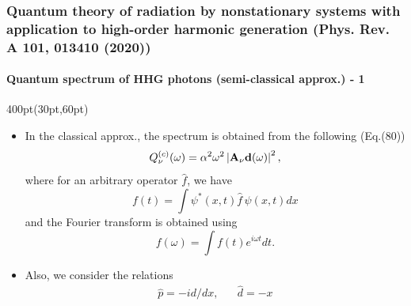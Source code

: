 \begin{frame}
\frametitle{Quantum theory of radiation by nonstationary systems 
	with application to high-order harmonic generation
        (Phys. Rev. A 101, 013410 (2020))}
	\framesubtitle{Quantum spectrum of HHG photons (semi-classical approx.) - 1}

\begin{textblock*}{400pt}(30pt,60pt)
\footnotesize
\begin{itemize}
\item In the classical approx., the spectrum is obtained from the following 
(Eq.(80))
\begin{equation}
Q^{(c)}_\nu (\omega) = 
 \alpha^2 \omega^2
    \left| \boldsymbol{\rm A}_{\nu}\boldsymbol{\rm d}(\omega) \right|^2,
\label{eqn:Qc}
\end{equation}
where for an arbitrary operator $\hat{f}$, we have   
\begin{equation}
f(t) = \int \psi^{*}(x,t)\hat{f}\,\psi(x,t)dx
\label{eqn:mean_value}
\end{equation}
and the Fourier transform is obtained using 
\begin{equation}
f(\omega) = \int f(t)e^{i\omega t}dt.
\label{eqn:fourier}
\end{equation}

\item Also, we consider the relations
\begin{align}
 \hat{p} = -i d/dx, \hspace{20pt} \hat{d} = -x
\end{align}
\end{itemize}
\end{textblock*}


\end{frame}






